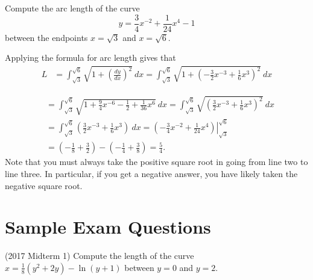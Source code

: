 \documentclass{ximera}
\begin{document}
\begin{question}%

Compute the arc length of the curve \[y = \frac{3}{4}x^{-2} + \frac{1}{24}x^{4} - 1\] between the endpoints \(x = \sqrt{3}\) and \(x = \sqrt{6}\).
\begin{multiplechoice}
\end{multiplechoice}
\begin{feedback}
Applying the formula for arc length gives that
\[
\begin{aligned}
L & = \int_{\sqrt{3}}^{\sqrt{6}} \sqrt{1 + \left( \frac{dy}{dx} \right)^2}~dx 
   = \int_{\sqrt{3}}^{\sqrt{6}} \sqrt{1 + \left( -\frac{3}{2}x^{-3} + \frac{1}{6}x^{3} \right)^2}~dx
\end{aligned}
\]
\begin{hint}
\[
\begin{aligned}
  & = \int_{\sqrt{3}}^{\sqrt{6}} \sqrt{1 + \frac{9}{4}x^{-6} - \frac{1}{2} + \frac{1}{36}x^{6}} ~ dx 
   = \int_{\sqrt{3}}^{\sqrt{6}} \sqrt{ \left( \frac{3}{2}x^{-3} + \frac{1}{6}x^{3} \right)^2} ~ dx \\
  & = \int_{\sqrt{3}}^{\sqrt{6}} \left( \frac{3}{2}x^{-3} + \frac{1}{6}x^{3} \right) ~ dx 
   = \left.  \left( -\frac{3}{4}x^{-2} + \frac{1}{24}x^{4} \right) \right|_{\sqrt{3}}^{\sqrt{6}} \\
  & =  \left( -\frac{1}{8} + \frac{3}{2} \right) - \left( -\frac{1}{4} + \frac{3}{8} \right) 
   = \frac{5}{4}.
\end{aligned}
\]
Note that you must always take the positive square root in going from line two to line three. In particular, if you get a negative answer, you have likely taken the negative square root.
\end{hint}
\end{feedback}

\end{question}

\section*{Sample Exam Questions}

\begin{question}(2017 Midterm 1)
Compute the length of the curve $x = \frac{1}{8} (y^2 + 2y) - \ln (y+1)$ between $y=0$ and $y = 2$.
\begin{multipleChoice}
\end{multipleChoice}
\end{question}
\end{document}
